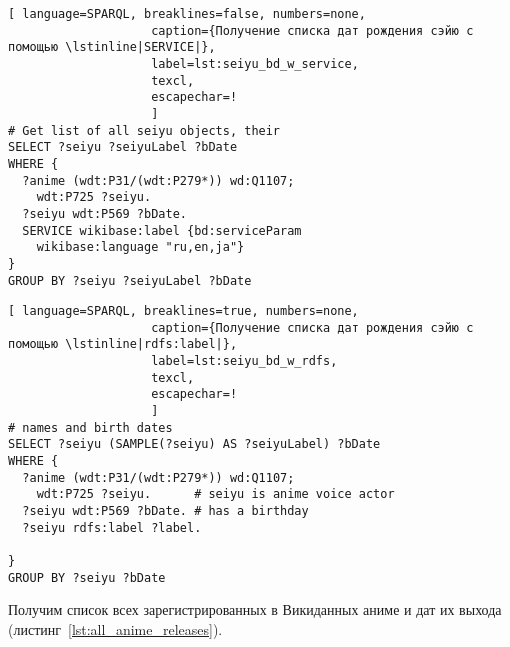 \begin{fullwidth}
%
\noindent\begin{minipage}[]{.43\linewidth}
\begin{lstlisting}[ language=SPARQL, breaklines=false, numbers=none,
                    caption={Получение списка дат рождения сэйю с помощью \lstinline|SERVICE|},
                    label=lst:seiyu_bd_w_service,
                    texcl,
                    escapechar=!
                    ]
# Get list of all seiyu objects, their 
SELECT ?seiyu ?seiyuLabel ?bDate
WHERE {
  ?anime (wdt:P31/(wdt:P279*)) wd:Q1107;
    wdt:P725 ?seiyu.       
  ?seiyu wdt:P569 ?bDate. 
  SERVICE wikibase:label {bd:serviceParam 
    wikibase:language "ru,en,ja"}
}
GROUP BY ?seiyu ?seiyuLabel ?bDate
\end{lstlisting}%
\end{minipage}%
\hfill
\begin{minipage}[]{.55\linewidth}
\begin{lstlisting}[ language=SPARQL, breaklines=true, numbers=none,
                    caption={Получение списка дат рождения сэйю с помощью \lstinline|rdfs:label|},
                    label=lst:seiyu_bd_w_rdfs,
                    texcl,
                    escapechar=!
                    ]
# names and birth dates
SELECT ?seiyu (SAMPLE(?seiyu) AS ?seiyuLabel) ?bDate
WHERE {
  ?anime (wdt:P31/(wdt:P279*)) wd:Q1107;
    wdt:P725 ?seiyu.      # seiyu is anime voice actor
  ?seiyu wdt:P569 ?bDate. # has a birthday 
  ?seiyu rdfs:label ?label.

}
GROUP BY ?seiyu ?bDate
\end{lstlisting}%
\end{minipage}
\end{fullwidth}%

Получим список всех зарегистрированных в Викиданных аниме и дат их выхода (листинг~\ref{lst:all_anime_releases}).

